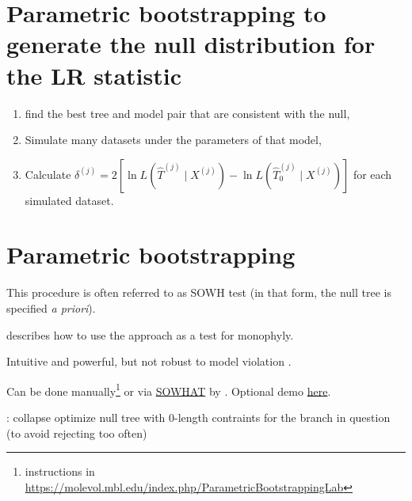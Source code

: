 


\myNewSlide
 

\myNewSlide
\section*{Parametric bootstrapping to generate the null distribution for the LR statistic}
\begin{enumerate}
    \item find the best tree and model pair that are consistent with the null,
    \item Simulate many datasets under the parameters of that model,
    \item Calculate $\delta^{(j)} = 2\left[\ln L (\hat{T}^{(j)} \mid  X^{(j)}) - \ln L (\hat{T}_{0}^{(j)} \mid  X^{(j)})\right]$ for each simulated dataset.
\end{enumerate}


\myNewSlide
\section*{Parametric bootstrapping}
This procedure is often referred to as SOWH test (in that form, the null tree is specified {\em a priori}).

\citet{HuelsenbeckHN1996} describes how to use the approach as a test for monophyly.

Intuitive and powerful, but not robust to model violation \citep{Buckley2002}.

Can be done manually\footnote{instructions in \url{https://molevol.mbl.edu/index.php/ParametricBootstrappingLab}}
or via \href{https://github.com/josephryan/sowhat}{SOWHAT} by \citet{SOWHAT}. Optional demo \href{https://molevol.mbl.edu/index.php/SOWHAT}{here}.

\citet{Susko2014}: collapse optimize null tree with 0-length contraints for the branch in question (to avoid rejecting too often)

\myNewSlide
 


\myNewSlide
 